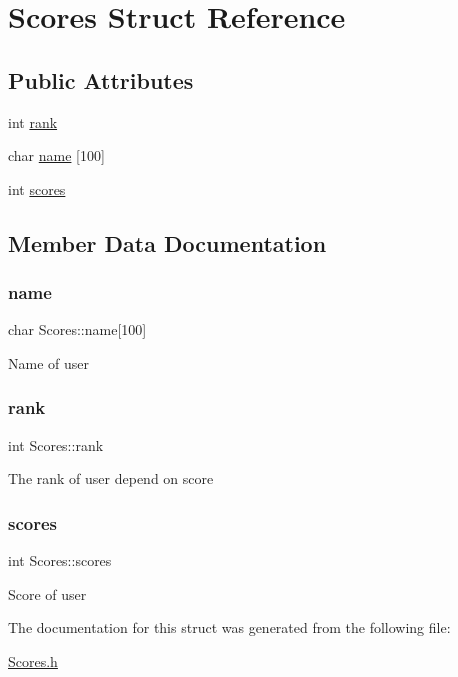 \hypertarget{struct_scores}{}\section{Scores Struct Reference}
\label{struct_scores}
\subsection*{Public Attributes}
\begin{DoxyCompactItemize}
\item 
int \hyperlink{struct_scores_aab2bf0fee1a8c2b6e85862c526ddbfae}{rank}
\item 
char \hyperlink{struct_scores_adc73cbe7efd07c64771ce7b0ef6c8a74}{name} \mbox{[}100\mbox{]}
\item 
int \hyperlink{struct_scores_adc160fc30f754360378856a273fef5e2}{scores}
\end{DoxyCompactItemize}


\subsection{Member Data Documentation}
\mbox{\label{struct_scores_adc73cbe7efd07c64771ce7b0ef6c8a74}} 
\subsubsection{\texorpdfstring{name}{name}}
{\footnotesize\ttfamily char Scores\+::name\mbox{[}100\mbox{]}}

Name of user \mbox{\label{struct_scores_aab2bf0fee1a8c2b6e85862c526ddbfae}} 
\subsubsection{\texorpdfstring{rank}{rank}}
{\footnotesize\ttfamily int Scores\+::rank}

The rank of user depend on score \mbox{\label{struct_scores_adc160fc30f754360378856a273fef5e2}} 
\subsubsection{\texorpdfstring{scores}{scores}}
{\footnotesize\ttfamily int Scores\+::scores}

Score of user 

The documentation for this struct was generated from the following file\+:\begin{DoxyCompactItemize}
\item 
\hyperlink{_scores_8h}{Scores.\+h}\end{DoxyCompactItemize}
